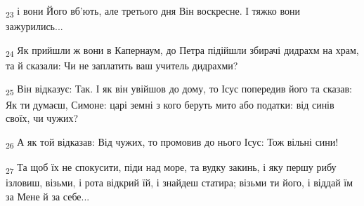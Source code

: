 \begin{tcolorbox}
\textsubscript{23} і вони Його вб'ють, але третього дня Він воскресне. І тяжко вони зажурились...
\end{tcolorbox}
\begin{tcolorbox}
\textsubscript{24} Як прийшли ж вони в Капернаум, до Петра підійшли збирачі дидрахм на храм, та й сказали: Чи не заплатить ваш учитель дидрахми?
\end{tcolorbox}
\begin{tcolorbox}
\textsubscript{25} Він відказує: Так. І як він увійшов до дому, то Ісус попередив його та сказав: Як ти думаєш, Симоне: царі земні з кого беруть мито або податки: від синів своїх, чи чужих?
\end{tcolorbox}
\begin{tcolorbox}
\textsubscript{26} А як той відказав: Від чужих, то промовив до нього Ісус: Тож вільні сини!
\end{tcolorbox}
\begin{tcolorbox}
\textsubscript{27} Та щоб їх не спокусити, піди над море, та вудку закинь, і яку першу рибу ізловиш, візьми, і рота відкрий їй, і знайдеш статира; візьми ти його, і віддай їм за Мене й за себе...
\end{tcolorbox}
